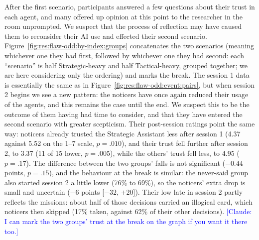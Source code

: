 After the first scenario, participants answered a few questions about their trust in each agent, and many offered up opinion at this point to the researcher in the room unprompted. We suspect that the process of reflection may have caused them to reconsider their AI use and effected their second scenario. Figure~\ref{fig:res:flaw-odd:by-index:groups} concatenates the two scenarios (meaning whichever one they had first, followed by whichever one they had second: each ``scenario'' is half Strategic-heavy and half Tactical-heavy, grouped together; we are here considering only the ordering) and marks the break. The session 1 data is essentially the same as in Figure~\ref{fig:res:flaw-odd:event:pairs}, but when session 2 begins we see a new pattern: the noticers have once again reduced their usage of the agents, and this remains the case until the end. We suspect this to be the outcome of them having had time to consider, and that they have entered the second scenario with greater scepticism. {\color{blue}Their post-session ratings point the same way: noticers already trusted the Strategic Assistant less after session 1 (4.37 against 5.52 on the 1--7 scale, $p = .010$), and their trust fell further after session 2, to 3.37 (11 of 15 lower, $p = .005$), while the others' trust fell less, to 4.95 ($p = .17$). The difference between the two groups' falls is not significant ($-0.44$ points, $p = .15$), and the behaviour at the break is similar: the never-said group also started session 2 a little lower (76\% to 69\%), so the noticers' extra drop is small and uncertain ($-6$ points [$-32$, $+20$]). Their low late in session 2 partly reflects the missions: about half of those decisions carried an illogical card, which noticers then skipped (17\% taken, against 62\% of their other decisions).} \textcolor{blue}{[Claude: I can mark the two groups' trust at the break on the graph if you want it there too.]}


